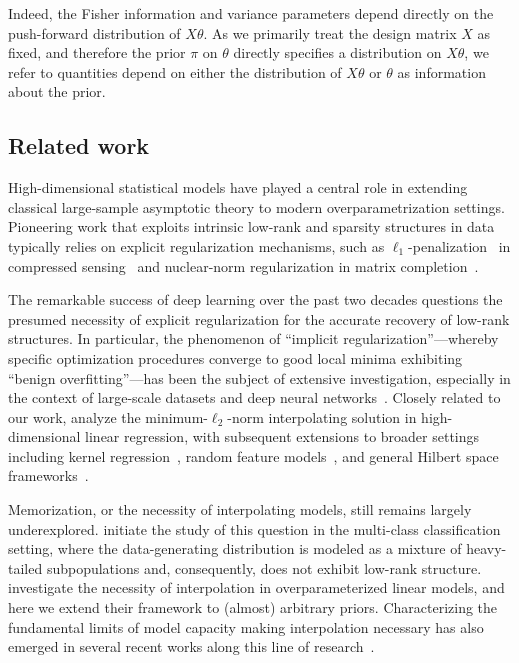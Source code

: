 \documentclass[11pt]{article}
\begin{document}
Indeed, the Fisher information and variance parameters depend directly on the push-forward distribution of $X\theta$. As we primarily
treat the design matrix $X$ as fixed, and therefore the prior $\pi$ on $\theta$ directly specifies a distribution on
$X\theta$, we refer to quantities depend on either the distribution of $X \theta$ or $\theta$ as information about the prior.

\subsection{Related work}
High-dimensional statistical models have played a central role in extending classical large-sample asymptotic theory to modern overparametrization settings. Pioneering work that exploits intrinsic low-rank and sparsity structures in data typically relies on explicit regularization mechanisms, such as $\ell_1$-penalization~\citep{tibshirani1996regression} in compressed sensing~\citep{candes2008enhancing} and nuclear-norm regularization in matrix completion~\citep{candes2012exact}.

The remarkable success of deep learning over the past two decades questions the presumed necessity of explicit regularization for the accurate recovery of low-rank structures. In particular, the phenomenon of ``implicit regularization''—whereby specific optimization procedures converge to good local minima exhibiting ``benign overfitting''—has been the subject of extensive investigation, especially in the context of large-scale datasets and deep neural networks~\citep{neyshabur2017implicit, gunasekar2017implicit}. Closely related to our work, \citet{hastie2022surprises} analyze the minimum-$\ell_2$-norm interpolating solution in high-dimensional linear regression, with subsequent extensions to broader settings including kernel regression~\citep{liang2020just}, random feature models~\citep{mei2022generalization}, and general Hilbert space frameworks~\citep{bartlett2020benign, cheng2024dimension}.

Memorization, or the necessity of interpolating models, still remains largely underexplored. \citet{feldman2020does} initiate the study of this question in the multi-class classification setting, where the data-generating distribution is modeled as a mixture of heavy-tailed subpopulations and, consequently, does not exhibit low-rank structure. \citet{cheng2022memorize} investigate the necessity of interpolation in overparameterized linear models, and here we extend their framework to (almost) arbitrary priors. Characterizing the fundamental limits of model capacity making interpolation necessary has also emerged in several recent works along this line of research~\citep{shah2025does, muller2025all}.
\end{document}

